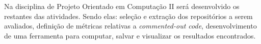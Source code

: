 \documentclass{abnt}
\begin{document}
  Na disciplina de Projeto Orientado em Computação II será desenvolvido
  os restantes das atividades. Sendo elas: seleção e extração dos repositórios 
  a serem avaliados, definição de métricas relativas a \textit{commented-out code},
  desenvolvimento de uma ferramenta para computar, salvar e visualizar os 
  resultados encontrados.



\end{document}
